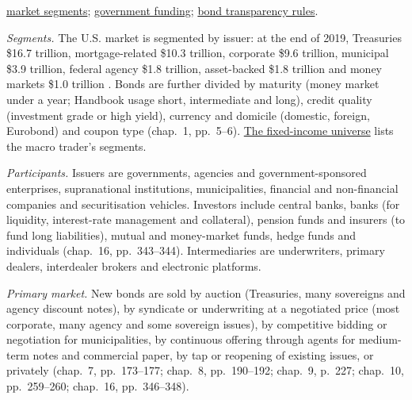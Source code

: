 \begin{qfrule}
 \hyperref[def:bond-market-segments-trading]{market segments}; \hyperref[def:government-agency-supranational-funding]{government funding}; \hyperref[rule:us-eu-bond-transparency]{bond transparency rules}.

\end{qfrule}

\begin{qfdefinition}\label{def:bond-market-segments-trading}
 \emph{Segments.} The U.S. market is segmented by issuer: at the end of 2019, Treasuries \$16.7 trillion, mortgage-related \$10.3 trillion, corporate \$9.6 trillion, municipal \$3.9 trillion, federal agency \$1.8 trillion, asset-backed \$1.8 trillion and money markets \$1.0 trillion \citep[chap.~1, Exhibit~1-1, p.~4]{s7-fabozzifixed}. Bonds are further divided by maturity (money market under a year; Handbook usage short, intermediate and long), credit quality (investment grade or high yield), currency and domicile (domestic, foreign, Eurobond) and coupon type (chap.~1, pp.~5--6). \hyperref[def:fixed-income-universe]{The fixed-income universe} lists the macro trader's segments.

\emph{Participants.} Issuers are governments, agencies and government-sponsored enterprises, supranational institutions, municipalities, financial and non-financial companies and securitisation vehicles. Investors include central banks, banks (for liquidity, interest-rate management and collateral), pension funds and insurers (to fund long liabilities), mutual and money-market funds, hedge funds and individuals (chap.~16, pp.~343--344). Intermediaries are underwriters, primary dealers, interdealer brokers and electronic platforms.

\emph{Primary market.} New bonds are sold by auction (Treasuries, many sovereigns and agency discount notes), by syndicate or underwriting at a negotiated price (most corporate, many agency and some sovereign issues), by competitive bidding or negotiation for municipalities, by continuous offering through agents for medium-term notes and commercial paper, by tap or reopening of existing issues, or privately (chap.~7, pp.~173--177; chap.~8, pp.~190--192; chap.~9, p.~227; chap.~10, pp.~259--260; chap.~16, pp.~346--348).


\end{qfdefinition}
